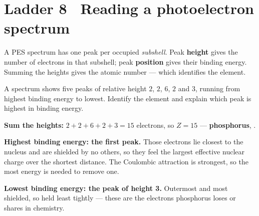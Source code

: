 \documentclass{apchem-worksheet}
\begin{document}
\section*{\sffamily Ladder 8 \textbullet\ Reading a photoelectron spectrum}

A PES spectrum has one peak per occupied \emph{subshell}. Peak
\textbf{height} gives the number of electrons in that subshell; peak
\textbf{position} gives their binding energy. Summing the heights gives
the atomic number --- which identifies the element.

\begin{workedexample}
A spectrum shows five peaks of relative height $2$, $2$, $6$, $2$ and $3$,
running from highest binding energy to lowest. Identify the element and
explain which peak is highest in binding energy.

\textbf{Sum the heights:} $2+2+6+2+3 = 15$ electrons, so $Z = 15$ ---
\textbf{phosphorus}, .

\textbf{Highest binding energy: the first  peak.} Those electrons
lie closest to the nucleus and are shielded by no others, so they feel the
largest effective nuclear charge over the shortest distance. The Coulombic
attraction is strongest, so the most energy is needed to remove one.

\textbf{Lowest binding energy: the  peak of height 3.} Outermost
and most shielded, so held least tightly --- these are the electrons
phosphorus loses or shares in chemistry.
\end{workedexample}
\end{document}
